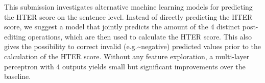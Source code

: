 This submission investigates alternative machine learning models for predicting the HTER score on the sentence level. Instead of directly predicting the HTER score, we suggest a model that jointly predicts the amount of the 4 distinct post-editing operations, which are then used to calculate the HTER score. This also gives the possibility to correct invalid (e.g.{\textasciitilde}negative) predicted values prior to the calculation of the HTER score. Without any feature exploration, a multi-layer perceptron with 4 outputs yields small but significant improvements over the baseline.
